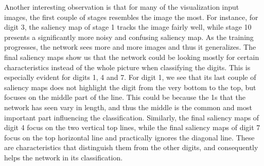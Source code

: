 \noindent Another interesting observation is that for many of the visualization input images, the first couple of stages resembles the image the most. For instance, for digit 3, the saliency map of stage 1 tracks the image fairly well, while stage 10 presents a significantly more noisy and confusing saliency map. As the training progresses, the network sees more and more images and thus it generalizes. The final saliency maps show us that the network could be looking mostly for certain characteristics instead of the whole picture when classifying the digits. This is especially evident for digits 1, 4 and 7. For digit 1, we see that its last couple of saliency maps does not highlight the digit from the very bottom to the top, but focuses on the middle part of the line. This could be because the 1s that the network has seen vary in length, and thus the middle is the common and most important part influencing the classification. Similarly, the final saliency maps of digit 4 focus on the two vertical top lines, while the final saliency maps of digit 7 focus on the top horizontal line and practically ignores the diagonal line. These are characteristics that distinguish them from the other digits, and consequently helps the network in its classification. \\

